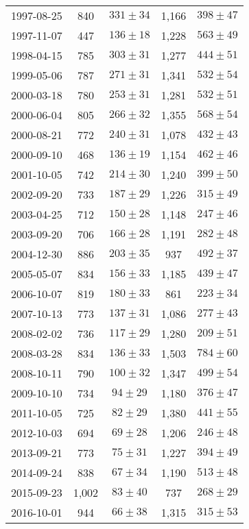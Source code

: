 \begin{longtable}{ccccc}
{1997-08-25} & 840 & {$331  \pm  34$} & 1,166 & {$398  \pm  47$} \\
{1997-11-07} & 447 & {$136  \pm  18$} & 1,228 & {$563  \pm  49$} \\
{1998-04-15} & 785 & {$303  \pm  31$} & 1,277 & {$444  \pm  51$} \\
{1999-05-06} & 787 & {$271  \pm  31$} & 1,341 & {$532  \pm  54$} \\
{2000-03-18} & 780 & {$253  \pm  31$} & 1,281 & {$532  \pm  51$} \\
{2000-06-04} & 805 & {$266  \pm  32$} & 1,355 & {$568  \pm  54$} \\
{2000-08-21} & 772 & {$240  \pm  31$} & 1,078 & {$432  \pm  43$} \\
{2000-09-10} & 468 & {$136  \pm  19$} & 1,154 & {$462  \pm  46$} \\
{2001-10-05} & 742 & {$214  \pm  30$} & 1,240 & {$399  \pm  50$} \\
{2002-09-20} & 733 & {$187  \pm  29$} & 1,226 & {$315  \pm  49$} \\
{2003-04-25} & 712 & {$150  \pm  28$} & 1,148 & {$247  \pm  46$} \\
{2003-09-20} & 706 & {$166  \pm  28$} & 1,191 & {$282  \pm  48$} \\
{2004-12-30} & 886 & {$203  \pm  35$} & 937 & {$492  \pm  37$} \\
{2005-05-07} & 834 & {$156  \pm  33$} & 1,185 & {$439  \pm  47$} \\
{2006-10-07} & 819 & {$180  \pm  33$} & 861 & {$223  \pm  34$} \\
{2007-10-13} & 773 & {$137  \pm  31$} & 1,086 & {$277  \pm  43$} \\
{2008-02-02} & 736 & {$117  \pm  29$} & 1,280 & {$209  \pm  51$} \\
{2008-03-28} & 834 & {$136  \pm  33$} & 1,503 & {$784  \pm  60$} \\
{2008-10-11} & 790 & {$100  \pm  32$} & 1,347 & {$499  \pm  54$} \\
{2009-10-10} & 734 & {$94  \pm  29$} & 1,180 & {$376  \pm  47$} \\
{2011-10-05} & 725 & {$82  \pm  29$} & 1,380 & {$441  \pm  55$} \\
{2012-10-03} & 694 & {$69  \pm  28$} & 1,206 & {$246  \pm  48$} \\
{2013-09-21} & 773 & {$75  \pm  31$} & 1,227 & {$394  \pm  49$} \\
{2014-09-24} & 838 & {$67  \pm  34$} & 1,190 & {$513  \pm  48$} \\
{2015-09-23} & 1,002 & {$83  \pm  40$} & 737 & {$268  \pm  29$} \\
{2016-10-01} & 944 & {$66  \pm  38$} & 1,315 & {$315  \pm  53$} \\
\end{longtable}
